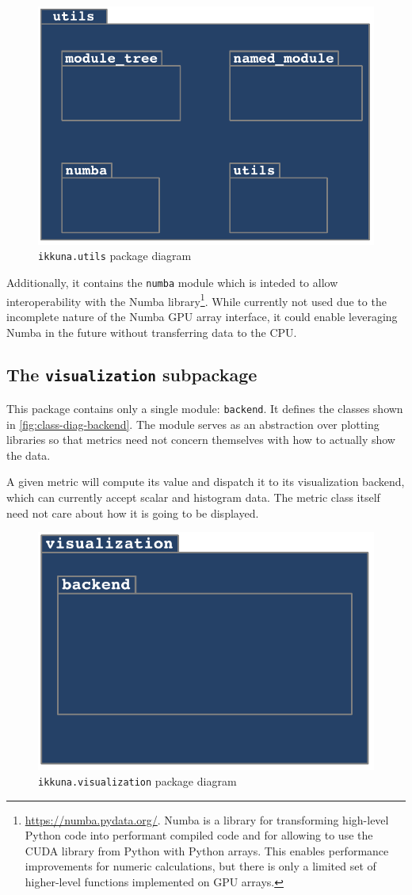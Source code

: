 \begin{figure}
    \hypertarget{fig:pack-diag-utils}{%
        \centering
        \includegraphics[max width=.5\textwidth]{gfx/diagrams/class_diagrams/utils_package_diagram.pdf}
        \caption{\texttt{ikkuna.utils} package diagram}\label{fig:pack-diag-utils}
    }
\end{figure}

Additionally, it contains the \texttt{numba} module
which is inteded to allow interoperability with the Numba
library\footnote{\url{https://numba.pydata.org/}. Numba is a library for
    transforming high-level Python code into performant compiled code and
    for allowing to use the CUDA library from Python with Python arrays.
    This enables performance improvements for numeric calculations, but
    there is only a limited set of higher-level functions implemented on
GPU arrays.}. While currently not used due to the incomplete nature of
the Numba GPU array interface, it could enable leveraging Numba in the
future without transferring data to the CPU.

\hypertarget{sec:pack-visualization}{%
\subsection{The \texttt{visualization} subpackage}\label{sec:pack-visualization}}

This package contains only a single module:
\texttt{backend}. It defines the classes shown in
\cref{fig:class-diag-backend}. The module serves as an abstraction over
plotting libraries so that metrics need not concern themselves with how
to actually show the data.

A given metric will compute its value and dispatch it to its
visualization backend, which can currently accept scalar and histogram
data. The metric class itself need not care about how it is going to be
displayed.

\begin{figure}
    \hypertarget{fig:pack-diag-visualization}{%
        \centering
        \includegraphics[max width=.5\textwidth]{gfx/diagrams/class_diagrams/visualization_package_diagram.pdf}
        \caption{\texttt{ikkuna.visualization} package diagram}\label{fig:pack-diag-visualization}
    }
\end{figure}

